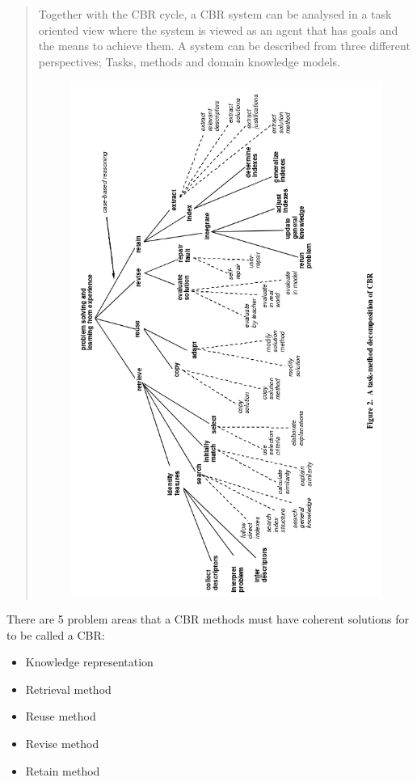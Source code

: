 \documentclass[11pt, letterpaper]{report}
\numberwithin{equation}{section}
\begin{document}
\begin{quote}
Together with the CBR cycle, a CBR system can be analysed in a task oriented
view where the system is viewed as an agent that has goals and the means to
achieve them. A system can be described from three different perspectives;
Tasks, methods and domain knowledge models.
\begin{figure}
  \centering
  \includegraphics[scale=0.75, angle=270]{task_meth_decomp}
\end{figure}
\end{quote}

There are 5 problem areas that a CBR methods must have coherent solutions for to
be called a CBR:
\begin{itemize}
\item Knowledge representation
\item Retrieval method
\item Reuse method
\item Revise method
\item Retain method
\end{itemize}
\end{document}
